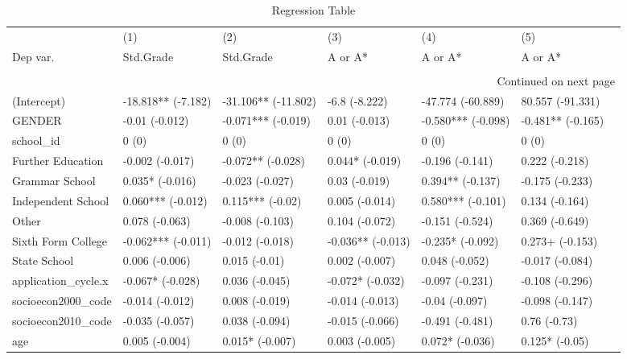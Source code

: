 \begin{longtable}{lllllll}
\caption{Regression Table} \label{tab:regression} \\
\toprule
 & (1) & (2) & (3) & (4) & (5) \\
Dep var. & Std.Grade & Std.Grade & A or A* & A or A* & A or A*\\
\midrule
\endfirsthead
\caption[]{Regression Table} \\
\toprule
\midrule
\endhead
\midrule
\multicolumn{7}{r}{Continued on next page} \\
\midrule
\endfoot
\bottomrule
\endlastfoot
(Intercept) & -18.818** 
 (-7.182) & -31.106** 
 (-11.802) & -6.8 
 (-8.222) & -47.774 
 (-60.889) & 80.557 
 (-91.331) \\
GENDER & -0.01 
 (-0.012) & -0.071*** 
 (-0.019) & 0.01 
 (-0.013) & -0.580*** 
 (-0.098) & -0.481** 
 (-0.165) \\
school\_id & 0 
 (0) & 0 
 (0) & 0 
 (0) & 0 
 (0) & 0 
 (0) \\
Further Education & -0.002 
 (-0.017) & -0.072** 
 (-0.028) & 0.044* 
 (-0.019) & -0.196 
 (-0.141) & 0.222 
 (-0.218) \\
Grammar School & 0.035* 
 (-0.016) & -0.023 
 (-0.027) & 0.03 
 (-0.019) & 0.394** 
 (-0.137) & -0.175 
 (-0.233) \\
Independent School & 0.060*** 
 (-0.012) & 0.115*** 
 (-0.02) & 0.005 
 (-0.014) & 0.580*** 
 (-0.101) & 0.134 
 (-0.164) \\
Other & 0.078 
 (-0.063) & -0.008 
 (-0.103) & 0.104 
 (-0.072) & -0.151 
 (-0.524) & 0.369 
 (-0.649) \\
Sixth Form College & -0.062*** 
 (-0.011) & -0.012 
 (-0.018) & -0.036** 
 (-0.013) & -0.235* 
 (-0.092) & 0.273+ 
 (-0.153) \\
State School & 0.006 
 (-0.006) & 0.015 
 (-0.01) & 0.002 
 (-0.007) & 0.048 
 (-0.052) & -0.017 
 (-0.084) \\
application\_cycle.x & -0.067* 
 (-0.028) & 0.036 
 (-0.045) & -0.072* 
 (-0.032) & -0.097 
 (-0.231) & -0.108 
 (-0.296) \\
socioecon2000\_code & -0.014 
 (-0.012) & 0.008 
 (-0.019) & -0.014 
 (-0.013) & -0.04 
 (-0.097) & -0.098 
 (-0.147) \\
socioecon2010\_code & -0.035 
 (-0.057) & 0.038 
 (-0.094) & -0.015 
 (-0.066) & -0.491 
 (-0.481) & 0.76 
 (-0.73) \\
age & 0.005 
 (-0.004) & 0.015* 
 (-0.007) & 0.003 
 (-0.005) & 0.072* 
 (-0.036) & 0.125* 
 (-0.05) \\

\end{longtable}
